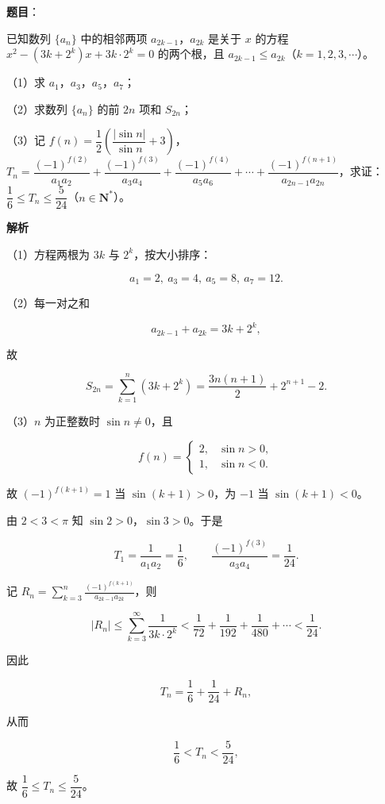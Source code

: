 \begin{answer}

\textbf{题目}：

已知数列 $\{a_n\}$ 中的相邻两项 $a_{2k-1}$，$a_{2k}$ 是关于 $x$ 的方程 $x^2-(3k+2^k)x+3k\cdot2^k=0$ 的两个根，且 $a_{2k-1}\leqslant a_{2k}$（$k=1,2,3,\cdots$）。

（1）求 $a_1$，$a_3$，$a_5$，$a_7$；

（2）求数列 $\{a_n\}$ 的前 $2n$ 项和 $S_{2n}$；

（3）记 $f(n)=\dfrac12\left(\dfrac{|\sin n|}{\sin n}+3\right)$，$T_n=\dfrac{(-1)^{f(2)}}{a_1a_2}+\dfrac{(-1)^{f(3)}}{a_3a_4}+\dfrac{(-1)^{f(4)}}{a_5a_6}+\cdots+\dfrac{(-1)^{f(n+1)}}{a_{2n-1}a_{2n}}$，求证：$\dfrac16\leqslant T_n\leqslant\dfrac5{24}$（$n\in\mathbf N^*$）。

\textbf{解析}

（1）方程两根为 $3k$ 与 $2^k$，按大小排序：

\nopagebreak[4]
\[a_1=2,\ a_3=4,\ a_5=8,\ a_7=12.\]

（2）每一对之和

\nopagebreak[4]
\[a_{2k-1}+a_{2k}=3k+2^k,\]

故

\nopagebreak[4]
\[S_{2n}=\sum_{k=1}^n(3k+2^k)=\frac{3n(n+1)}2+2^{n+1}-2.\]

（3）$n$ 为正整数时 $\sin n\neq0$，且

\nopagebreak[4]
\[f(n)=\begin{cases}2,&\sin n>0,\\1,&\sin n<0.\end{cases}\]

故 $(-1)^{f(k+1)}=1$ 当 $\sin(k+1)>0$，为 $-1$ 当 $\sin(k+1)<0$。

由 $2<3<\pi$ 知 $\sin2>0$，$\sin3>0$。于是

\nopagebreak[4]
\[T_1=\frac1{a_1a_2}=\frac16,\qquad \frac{(-1)^{f(3)}}{a_3a_4}=\frac1{24}.\]

记 $R_n=\displaystyle\sum_{k=3}^n\frac{(-1)^{f(k+1)}}{a_{2k-1}a_{2k}}$，则

\nopagebreak[4]
\[|R_n|\leqslant\sum_{k=3}^{\infty}\frac1{3k\cdot2^k}
<\frac1{72}+\frac1{192}+\frac1{480}+\cdots<\frac1{24}.\]

因此

\nopagebreak[4]
\[T_n=\frac16+\frac1{24}+R_n,\]

从而

\nopagebreak[4]
\[\frac16<T_n<\frac5{24},\]

故 $\dfrac16\leqslant T_n\leqslant\dfrac5{24}$。


\end{answer}
